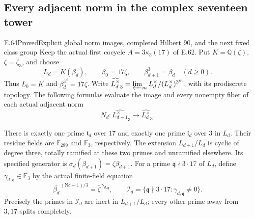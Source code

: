 \subsection{Every adjacent norm in the complex seventeen tower}

\begin{statement}{E.64}{Proved}{Explicit global norm images, completed Hilbert 90, and the next fixed class group}
Keep the actual first cocycle $A=3\kappa_3(17)$ of E.62.
Put $K=\mathbb Q(\zeta)$, $\zeta=\zeta_3$, and choose
\[
 L_d=K(\beta_d),\qquad
 \beta_0=17\zeta,\qquad \beta_{d+1}^3=\beta_d
 \quad(d\geq0).
 \tag{E64.1}
\]
Thus $L_0=K$ and $\beta_d^{3^d}=17\zeta$.
Write $\widehat{L_d^\times}_3=\varprojlim_m
 L_d^\times/(L_d^\times)^{3^m}$, with its prodiscrete topology.
The following formulas evaluate the image and every nonempty fiber of
each actual adjacent norm
\[
 N_d:\widehat{L_{d+1}^\times}_3
                   \longrightarrow\widehat{L_d^\times}_3.
 \tag{E64.2}
\]

There is exactly one prime $\mathfrak t_d$ over $17$ and exactly one
prime $\mathfrak l_d$ over $3$ in $L_d$. Their residue fields are
$\mathbb F_{289}$ and $\mathbb F_3$, respectively. The extension
$L_{d+1}/L_d$ is cyclic of degree three, totally ramified at these two
primes and unramified elsewhere. Its specified generator is
$\sigma_d(\beta_{d+1})=\zeta\beta_{d+1}$.
For a prime $\mathfrak q\nmid 3\cdot17$ of $L_d$, define
$\gamma_{d,\mathfrak q}\in\mathbb F_3$ by the actual finite-field equation
\[
 \overline{\beta_d}^{\,(\mathrm N\mathfrak q-1)/3}
       =\overline\zeta^{\,\gamma_{d,\mathfrak q}},
 \qquad
 \mathcal I_d=\{\mathfrak q\nmid3\cdot17:
                         \gamma_{d,\mathfrak q}\ne0\}.
 \tag{E64.3}
\]
Precisely the primes in $\mathcal I_d$ are inert in
$L_{d+1}/L_d$; every other prime away from $3,17$ splits completely.


\end{statement}
